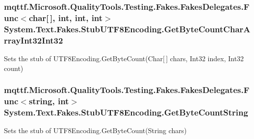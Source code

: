 \hypertarget{class_system_1_1_text_1_1_fakes_1_1_stub_u_t_f8_encoding_ac29d61bdf1c51f9edbd8fb2d22f89d8b}{
\subsubsection[{Get\-Byte\-Count\-Char\-Array\-Int32\-Int32}]{\setlength{\rightskip}{0pt plus 5cm}mqttf.\-Microsoft.\-Quality\-Tools.\-Testing.\-Fakes.\-Fakes\-Delegates.\-Func$<$char\mbox{[}$\,$\mbox{]}, int, int, int$>$ System.\-Text.\-Fakes.\-Stub\-U\-T\-F8\-Encoding.\-Get\-Byte\-Count\-Char\-Array\-Int32\-Int32}}\label{class_system_1_1_text_1_1_fakes_1_1_stub_u_t_f8_encoding_ac29d61bdf1c51f9edbd8fb2d22f89d8b}


Sets the stub of U\-T\-F8\-Encoding.\-Get\-Byte\-Count(\-Char\mbox{[}$\,$\mbox{]} chars, Int32 index, Int32 count)

\hypertarget{class_system_1_1_text_1_1_fakes_1_1_stub_u_t_f8_encoding_a93f570c145ee28d86744276cc9f616e7}{
\subsubsection[{Get\-Byte\-Count\-String}]{\setlength{\rightskip}{0pt plus 5cm}mqttf.\-Microsoft.\-Quality\-Tools.\-Testing.\-Fakes.\-Fakes\-Delegates.\-Func$<$string, int$>$ System.\-Text.\-Fakes.\-Stub\-U\-T\-F8\-Encoding.\-Get\-Byte\-Count\-String}}\label{class_system_1_1_text_1_1_fakes_1_1_stub_u_t_f8_encoding_a93f570c145ee28d86744276cc9f616e7}


Sets the stub of U\-T\-F8\-Encoding.\-Get\-Byte\-Count(\-String chars)

